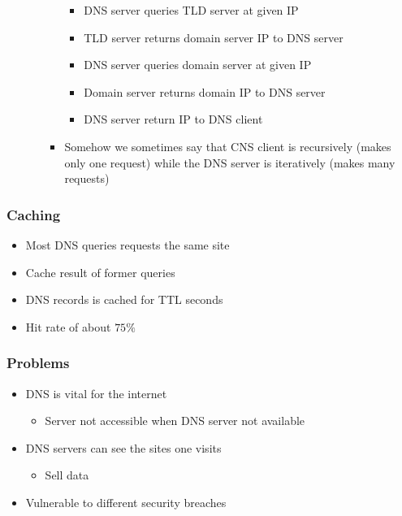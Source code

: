 \begin{itemize}
\begin{itemize}
\begin{itemize}
\begin{itemize}
                            \item DNS server queries TLD server at given IP
                            \item TLD server returns domain server IP to DNS server
                            \item DNS server queries domain server at given IP
                            \item Domain server returns domain IP to DNS server
                            \item DNS server return IP to DNS client
                        \end{itemize}
                    \item Somehow we sometimes say that CNS client is recursively (makes only one request) while the DNS server is iteratively (makes many requests)
                \end{itemize}
        \end{itemize}
\end{itemize}

\subsubsection{Caching}
\begin{itemize}
    \item Most DNS queries requests the same site
    \item Cache result of former queries
    \item DNS records is cached for TTL seconds
    \item Hit rate of about $75\%$
\end{itemize}

\subsubsection{Problems}
\begin{itemize}
    \item DNS is vital for the internet
        \begin{itemize}
            \item Server not accessible when DNS server not available
        \end{itemize}
    \item DNS servers can see the sites one visits
        \begin{itemize}
            \item Sell data
        \end{itemize}
    \item Vulnerable to different security breaches
\end{itemize}

